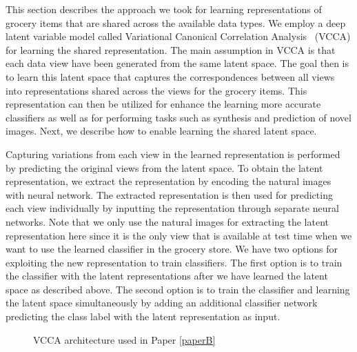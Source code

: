 This section describes the approach we took for learning representations of grocery items that are shared across the available data types. We employ a deep latent variable model called Variational Canonical Correlation Analysis~\cite{wang2016deep} (VCCA) for learning the shared representation. The main assumption in VCCA is that each data view have been generated from the same latent space. The goal then is to learn this latent space that captures the correspondences between all views into representations shared across the views for the grocery items. This representation can then be utilized for enhance the learning more accurate classifiers as well as for performing tasks such as synthesis and prediction of novel images. Next, we describe how to enable learning the shared latent space. 

Capturing variations from each view in the learned representation is performed by predicting the original views from the latent space. To obtain the latent representation, we extract the representation by encoding the natural images with neural network. The extracted representation is then used for predicting each view individually by inputting the representation through separate neural networks. Note that we only use the natural images for extracting the latent representation here since it is the only view that is available at test time when we want to use the learned classifier in the grocery store. We have two options for exploiting the new representation to train classifiers. The first option is to train the classifier with the latent representations after we have learned the latent space as described above. The second option is to train the classifier and learning the latent space simultaneously by adding an additional classifier network predicting the class label with the latent representation as input. 

\begin{figure}[t]
	\centering
	\resizebox{0.95\textwidth}{!}{
		
	}
	\caption{VCCA architecture used in Paper \ref{paperB}}
	\label{fig:vcca_architecture}
\end{figure}






